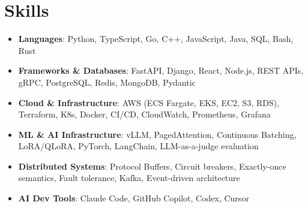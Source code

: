 \documentclass[letterpaper,11pt]{article}
\newcommand{\resumeSubHeadingListStart}{\begin{itemize}[leftmargin=0.15in, label={}]}
\newcommand{\resumeSubHeadingListEnd}{\end{itemize}}
\newcommand{\resumeSkillHeading}[2]{%
  \item\small{\textbf{#1}: #2 \vspace{-9pt}}%
}
\begin{document}
\section{Skills}
  \resumeSubHeadingListStart
    \resumeSkillHeading{Languages}{Python, TypeScript, Go, C++, JavaScript, Java, SQL, Bash, Rust}
    \resumeSkillHeading{Frameworks \& Databases}{FastAPI, Django, React, Node.js, REST APIs, gRPC, PostgreSQL, Redis, MongoDB, Pydantic}
    \resumeSkillHeading{Cloud \& Infrastructure}{AWS (ECS Fargate, EKS, EC2, S3, RDS), Terraform, K8s, Docker, CI/CD, CloudWatch, Prometheus, Grafana}
    \resumeSkillHeading{ML \& AI Infrastructure}{vLLM, PagedAttention, Continuous Batching, LoRA/QLoRA, PyTorch, LangChain, LLM-as-a-judge evaluation}
    \resumeSkillHeading{Distributed Systems}{Protocol Buffers, Circuit breakers, Exactly-once semantics, Fault tolerance, Kafka, Event-driven architecture}
    \resumeSkillHeading{AI Dev Tools}{Claude Code, GitHub Copilot, Codex, Cursor}
  \resumeSubHeadingListEnd
\end{document}
